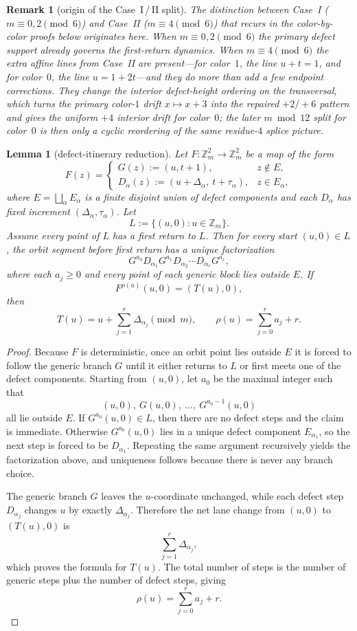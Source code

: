 \documentclass[11pt]{article}
\newtheorem{lemma}{Lemma}
\newtheorem{remark}{Remark}
\newcommand{\Zm}{\mathbb Z_m}
\begin{document}
\begin{remark}[origin of the Case~I\,/\,II split]
\label{rem:mod6-split}
The distinction between Case~I ($m\equiv 0,2\pmod 6$) and Case~II ($m\equiv 4\pmod 6$) that recurs in the color-by-color proofs below originates here.
When $m\equiv 0,2\pmod 6$ the primary defect support already governs the first-return dynamics.
When $m\equiv 4\pmod{6}$ the extra affine lines from Case~II are present---for color~$1$, the line $u+t=1$, and for color~$0$, the line $u=1+2t$---and they do more than add a few endpoint corrections.
They change the interior defect-height ordering on the transversal, which turns the primary color-$1$ drift $x\mapsto x+3$ into the repaired $+2/+6$ pattern and gives the uniform $+4$ interior drift for color~$0$; the later $m\bmod 12$ split for color~$0$ is then only a cyclic reordering of the same residue-$4$ splice picture.
\end{remark}

\begin{lemma}[defect-itinerary reduction]\label{lem:routeE-itinerary}
Let $F:\Zm^2\to\Zm^2$ be a map of the form
\[
F(z)=
\begin{cases}
G(z):=(u,t+1), & z\notin E,\\
D_\alpha(z):=(u+\Delta_\alpha,\ t+\tau_\alpha), & z\in E_\alpha,
\end{cases}
\]
where $E=\bigsqcup_\alpha E_\alpha$ is a finite disjoint union of defect components and each $D_\alpha$ has fixed increment $(\Delta_\alpha,\tau_\alpha)$.
Let
\[
L:=\{(u,0):u\in\Zm\}.
\]
Assume every point of $L$ has a first return to $L$.
Then for every start $(u,0)\in L$, the orbit segment before first return has a unique factorization
\[
G^{a_0}D_{\alpha_1}G^{a_1}D_{\alpha_2}\cdots D_{\alpha_r}G^{a_r},
\]
where each $a_j\ge 0$ and every point of each generic block lies outside $E$.
If
\[
F^{\rho(u)}(u,0)=(T(u),0),
\]
then
\[
T(u)=u+\sum_{j=1}^r \Delta_{\alpha_j}\pmod m,
\qquad
\rho(u)=\sum_{j=0}^r a_j+r.
\]
\end{lemma}

\begin{proof}
Because $F$ is deterministic, once an orbit point lies outside $E$ it is forced to follow the generic branch $G$ until it either returns to $L$ or first meets one of the defect components.
Starting from $(u,0)$, let $a_0$ be the maximal integer such that
\[
(u,0),\ G(u,0),\ \dots,\ G^{a_0-1}(u,0)
\]
all lie outside $E$.
If $G^{a_0}(u,0)\in L$, then there are no defect steps and the claim is immediate.
Otherwise $G^{a_0}(u,0)$ lies in a unique defect component $E_{\alpha_1}$, so the next step is forced to be $D_{\alpha_1}$.
Repeating the same argument recursively yields the factorization above, and uniqueness follows because there is never any branch choice.

The generic branch $G$ leaves the $u$-coordinate unchanged, while each defect step $D_{\alpha_j}$ changes $u$ by exactly $\Delta_{\alpha_j}$.
Therefore the net lane change from $(u,0)$ to $(T(u),0)$ is
\[
\sum_{j=1}^r \Delta_{\alpha_j},
\]
which proves the formula for $T(u)$.
The total number of steps is the number of generic steps plus the number of defect steps, giving
\[
\rho(u)=\sum_{j=0}^r a_j+r.
\]
\end{proof}
\end{document}
